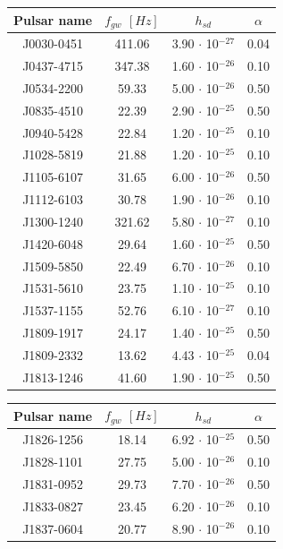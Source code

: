 \documentclass[11pt,a4paper,final]{iopart}
\begin{document}
\begin{table}[h!]\hspace{-0.8cm}
\begin{tabular}[t]{c|ccc}
\toprule
   \textbf{Pulsar name} & $f_{gw}$ $[Hz]$ &  $h_ {sd}$  & $\alpha$\\
\midrule 
J0030-0451  & 411.06 & 3.90 $\cdot$ 10$^{-27}$ & 0.04 \\
J0437-4715 & 347.38 & 1.60 $\cdot$ 10$^{-26}$ & 0.10 \\
J0534-2200 & 59.33  & 5.00 $\cdot$ 10$^{-26}$  & 0.50 \\
J0835-4510 & 22.39  & 2.90 $\cdot$ 10$^{-25}$ & 0.50 \\
J0940-5428 & 22.84  & 1.20 $\cdot$ 10$^{-25}$ & 0.10 \\
J1028-5819 & 21.88  & 1.20 $\cdot$ 10$^{-25}$ & 0.10 \\
J1105-6107 & 31.65  & 6.00 $\cdot$ 10$^{-26}$ & 0.50 \\
J1112-6103 & 30.78  & 1.90 $\cdot$ 10$^{-26}$ & 0.10 \\
J1300-1240 & 321.62 & 5.80 $\cdot$ 10$^{-27 }$ & 0.10 \\
J1420-6048 & 29.64  & 1.60 $\cdot$ 10$^{-25}$ & 0.50 \\
J1509-5850 & 22.49  & 6.70 $\cdot$ 10$^{-26}$ & 0.10 \\
J1531-5610 & 23.75  & 1.10 $\cdot$ 10$^{-25}$ & 0.10 \\
J1537-1155 & 52.76  & 6.10 $\cdot$ 10$^{-27 }$ & 0.10 \\
J1809-1917 & 24.17  & 1.40 $\cdot$ 10$^{-25}$ & 0.50 \\
J1809-2332 & 13.62  & 4.43 $\cdot$ 10$^{-25}$ & 0.04 \\
J1813-1246 & 41.60  & 1.90 $\cdot$ 10$^{-25}$ & 0.50 \\
\midrule
\end{tabular}
\hspace{0.5cm}
\begin{tabular}[t]{c|ccc}
\toprule
  \textbf{Pulsar name} & $f_{gw}$ $[Hz]$ &  $h_ {sd}$  & $\alpha$\\
\midrule 
J1826-1256 & 18.14  & 6.92 $\cdot$ 10$^{-25}$ & 0.50 \\
J1828-1101 & 27.75  & 5.00 $\cdot$ 10$^{-26}$ & 0.10 \\
J1831-0952 & 29.73  & 7.70 $\cdot$ 10$^{-26}$ & 0.50 \\
J1833-0827 & 23.45  & 6.20 $\cdot$ 10$^{-26}$ & 0.10 \\
J1837-0604 & 20.77  & 8.90 $\cdot$ 10$^{-26}$ & 0.10 \\

\end{tabular}
\end{table}
\end{document}
